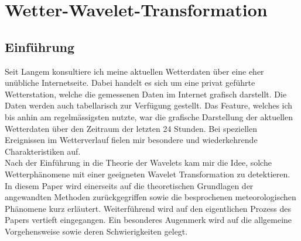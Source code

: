 %
%
%
\chapter{Wetter-Wavelet-Transformation\label{chapter:wwt}}
\begin{refsection}




\lstset{style=mystyle}


\section{Einführung}


Seit Langem konsultiere ich meine aktuellen Wetterdaten über eine eher unübliche Internetseite.
Dabei handelt es sich um eine privat geführte Wetterstation, welche die gemessenen Daten im Internet grafisch darstellt.
Die Daten werden auch tabellarisch zur Verfügung gestellt.
Das Feature, welches ich bis anhin am regelmässigsten nutzte, war die grafische Darstellung der aktuellen Wetterdaten über den Zeitraum der letzten 24 Stunden.
Bei speziellen Ereignissen im Wetterverlauf fielen mir besondere und wiederkehrende Charakteristiken auf.
\\

Nach der Einführung in die Theorie der Wavelets kam mir die Idee, solche Wetterphänomene mit einer geeigneten Wavelet Transformation zu detektieren.
In diesem Paper wird einerseits auf die theoretischen Grundlagen der angewandten Methoden zurückgegriffen sowie die besprochenen meteorologischen Phänomene kurz erläutert. 
Weiterführend wird auf den eigentlichen Prozess des Papers vertieft eingegangen.
Ein besonderes Augenmerk wird auf die allgemeine Vorgehensweise sowie deren Schwierigkeiten gelegt.
\\





\end{refsection}
